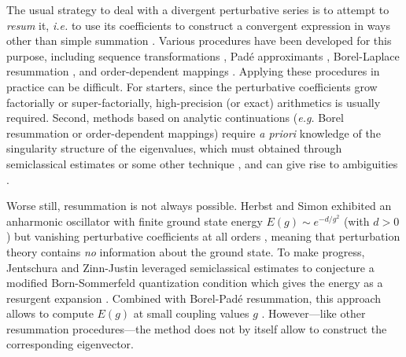 \documentclass[aps,prl,reprint]{revtex4-2}
\begin{document}
	The usual strategy to deal with a divergent perturbative series is to attempt to \emph{resum} it, \emph{i.e.} to use its coefficients to construct a convergent expression in ways other than simple summation \cite{guillouLargeOrderBehaviourPerturbation1990,jankeResummationDivergentPerturbation2007, Calicetiusefulalgorithmsslowly2007}. Various procedures have been developed for this purpose, including sequence transformations \cite{wenigerNonlinearSequenceTransformations1989}, Padé approximants \cite{loeffelPadeApproximantsAnharmonic1969}, Borel-Laplace resummation \cite{graffiBorelSummabilityApplication1970, mera2015nonperturbative, delabaereDivergentSeriesSummability2016}, and order-dependent mappings \cite{seznec1979summation}. Applying these procedures in practice can be difficult. For starters, since the perturbative coefficients grow factorially or super-factorially, high-precision (or exact) arithmetics is usually required. Second, methods based on analytic continuations (\emph{e.g.} Borel resummation or order-dependent mappings) require \emph{a priori} knowledge of the singularity structure of the eigenvalues, which must obtained through semiclassical estimates \cite{guillouLargeOrderBehaviourPerturbation1990} or some other technique \cite{kvaal2011computing}, and can give rise to ambiguities \cite{delabaereDivergentSeriesSummability2016}.

	Worse still, resummation is not always possible. Herbst and Simon exhibited an anharmonic oscillator with finite ground state energy $E(g)\sim e^{-d/g^2}$ (with $d>0$) but vanishing perturbative coefficients at all orders \cite{Herbstremarkableexampleseigenvalue1978}, meaning that perturbation theory contains \emph{no} information about the ground state. To make progress, Jentschura and Zinn-Justin leveraged semiclassical estimates to conjecture a modified Born-Sommerfeld quantization condition \cite{ZinnJustinMultiinstantonsexactresults2004,JentschuraInstantonsquantummechanics2004} which gives the energy as a resurgent expansion \cite{Anicetoprimerresurgenttransseries2019}. Combined with Borel-Padé resummation, this approach allows to compute $E(g)$ at small coupling values $g$ \cite{SurzhykovQuantumdotpotentials2006}. However---like other resummation procedures---the method does not by itself allow to construct the corresponding eigenvector.
\end{document}

